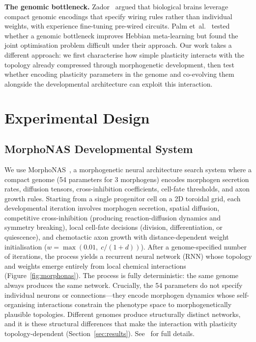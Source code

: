 \documentclass[sigconf,nonacm]{acmart}
\begin{document}
\textbf{The genomic bottleneck.}
Zador~\cite{zador2019critique} argued that biological brains leverage compact genomic encodings that specify wiring rules rather than individual weights, with experience fine-tuning pre-wired circuits. Palm et~al.~\cite{palm2021testing} tested whether a genomic bottleneck improves Hebbian meta-learning but found the joint optimisation problem difficult under their approach. Our work takes a different approach: we first characterise how simple plasticity interacts with the topology already compressed through morphogenetic development, then test whether encoding plasticity parameters in the genome and co-evolving them alongside the developmental architecture can exploit this interaction.

\section{Experimental Design}
\label{sec:design}

\subsection{MorphoNAS Developmental System}

We use MorphoNAS~\cite{glybovets2026morphonas}, a morphogenetic neural architecture search system where a compact genome (54 parameters for 3 morphogens) encodes morphogen secretion rates, diffusion tensors, cross-inhibi\-tion coefficients, cell-fate thresholds, and axon growth rules. Starting from a single progenitor cell on a 2D toroidal grid, each developmental iteration involves morphogen secretion, spatial diffusion, competitive cross-inhibition (producing reaction-diffusion dynamics and symmetry breaking), local cell-fate decisions (division, differentiation, or quiescence), and chemotactic axon growth with distance-dependent weight initialisation ($w = \max(0.01,\; c/(1+d))$). After a genome-specified number of iterations, the process yields a recurrent neural network (RNN) whose topology and weights emerge entirely from local chemical interactions (Figure~\ref{fig:morphonas}). The process is fully deterministic: the same genome always produces the same network. Crucially, the 54 parameters do not specify individual neurons or connections---they encode morphogen dynamics whose self-organising interactions constrain the phenotype space to morphogenetically plausible topologies. Different genomes produce structurally distinct networks, and it is these structural differences that make the interaction with plasticity topology-dependent (Section~\ref{sec:results}). See~\cite{glybovets2026morphonas} for full details.
\end{document}

